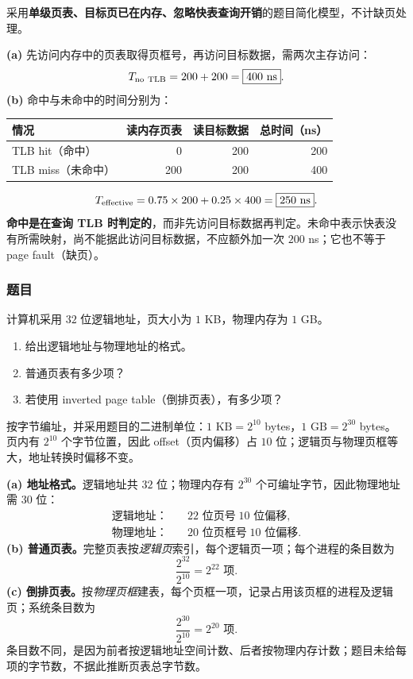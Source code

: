 \begin{checkedsolution}
\nopagebreak[4]
采用\textbf{单级页表、目标页已在内存、忽略快表查询开销}的题目简化模型，不计缺页处理。

\textbf{(a)} 先访问内存中的页表取得页框号，再访问目标数据，需两次主存访问：
\[
  T_{\rm no\ TLB}=200+200=\boxed{400\text{ ns}}.
\]
\textbf{(b)} 命中与未命中的时间分别为：
\begin{center}
\begin{tabular}{@{}lrrr@{}}
\toprule
情况 & 读内存页表 & 读目标数据 & 总时间（ns） \\
\midrule
TLB hit（命中） & 0 & 200 & 200 \\
TLB miss（未命中） & 200 & 200 & 400 \\
\bottomrule
\end{tabular}
\end{center}
\[
  T_{\rm effective}=0.75\times200+0.25\times400=\boxed{250\text{ ns}}.
\]
\textbf{命中是在查询 TLB 时判定的}，而非先访问目标数据再判定。未命中表示快表没有所需映射，尚不能据此访问目标数据，不应额外加一次 $200$ ns；它也不等于 page fault（缺页）。
\end{checkedsolution}

\nopagebreak[4]

\subsubsection*{题目}

计算机采用 $32$ 位逻辑地址，页大小为 $1$ KB，物理内存为 $1$ GB。
\begin{enumerate}[label=(\alph*)]
  \item 给出逻辑地址与物理地址的格式。
  \item 普通页表有多少项？
  \item 若使用 inverted page table（倒排页表），有多少项？
\end{enumerate}

\begin{checkedsolution}
\nopagebreak[4]
按字节编址，并采用题目的二进制单位：$1\text{ KB}=2^{10}$ bytes，$1\text{ GB}=2^{30}$ bytes。页内有 $2^{10}$ 个字节位置，因此 offset（页内偏移）占 $10$ 位；逻辑页与物理页框等大，地址转换时偏移不变。

\textbf{(a) 地址格式。}逻辑地址共 $32$ 位；物理内存有 $2^{30}$ 个可编址字节，因此物理地址需 $30$ 位：
\[
\begin{aligned}
  \text{逻辑地址：}&\quad\boxed{22\text{ 位页号}}\;\boxed{10\text{ 位偏移}},\\
  \text{物理地址：}&\quad\boxed{20\text{ 位页框号}}\;\boxed{10\text{ 位偏移}}.
\end{aligned}
\]
\textbf{(b) 普通页表。}完整页表按\emph{逻辑页}索引，每个逻辑页一项；每个进程的条目数为
\[
  \frac{2^{32}}{2^{10}}=\boxed{2^{22}\text{ 项}}.
\]
\textbf{(c) 倒排页表。}按\emph{物理页框}建表，每个页框一项，记录占用该页框的进程及逻辑页；系统条目数为
\[
  \frac{2^{30}}{2^{10}}=\boxed{2^{20}\text{ 项}}.
\]
条目数不同，是因为前者按逻辑地址空间计数、后者按物理内存计数；题目未给每项的字节数，不据此推断页表总字节数。
\end{checkedsolution}

